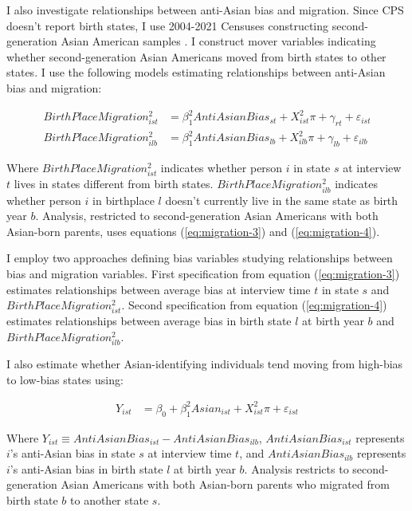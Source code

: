 I also investigate relationships between anti-Asian bias and migration. Since CPS doesn't report birth states, I use 2004-2021 Censuses constructing second-generation Asian American samples \autocite{floodsarahIntegratedPublicUse2021}. I construct mover variables indicating whether second-generation Asian Americans moved from birth states to other states. I use the following models estimating relationships between anti-Asian bias and migration:

\begin{align}
BirthPlaceMigration_{ist}^2 &= \beta_1^2 AntiAsianBias_{st} 
                   + X_{ist}^2\pi + \gamma_{rt} 
                   + \varepsilon_{ist} \label{eq:migration-3} \\
BirthPlaceMigration_{ilb}^2 &= \beta_1^2 AntiAsianBias_{lb} 
                   + X_{ilb}^2\pi + \gamma_{lb} 
                   + \varepsilon_{ilb} \label{eq:migration-4}
\end{align}

Where $BirthPlaceMigration_{ist}^2$ indicates whether person $i$ in state $s$ at interview $t$ lives in states different from birth states. $BirthPlaceMigration_{ilb}^2$ indicates whether person $i$ in birthplace $l$ doesn't currently live in the same state as birth year $b$. Analysis, restricted to second-generation Asian Americans with both Asian-born parents, uses equations (\ref{eq:migration-3}) and (\ref{eq:migration-4}).

I employ two approaches defining bias variables studying relationships between bias and migration variables. First specification from equation (\ref{eq:migration-3}) estimates relationships between average bias at interview time $t$ in state $s$ and $BirthPlaceMigration_{ist}^2$. Second specification from equation (\ref{eq:migration-4}) estimates relationships between average bias in birth state $l$ at birth year $b$ and $BirthPlaceMigration_{ilb}^2$.

I also estimate whether Asian-identifying individuals tend moving from high-bias to low-bias states using:

\begin{align}
Y_{ist} &= \beta_0 + \beta_1^2 Asian_{ist} +
                   X_{ist}^2\pi
                   + \varepsilon_{ist} \label{eq:migration-5}
\end{align}

Where $Y_{ist} \equiv AntiAsianBias_{ist} - AntiAsianBias_{ilb}$, $AntiAsianBias_{ist}$ represents $i$'s anti-Asian bias in state $s$ at interview time $t$, and $AntiAsianBias_{ilb}$ represents $i$'s anti-Asian bias in birth state $l$ at birth year $b$. Analysis restricts to second-generation Asian Americans with both Asian-born parents who migrated from birth state $b$ to another state $s$.

